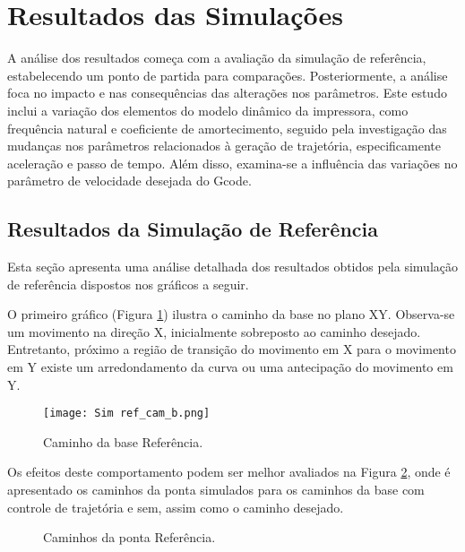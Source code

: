 \section{Resultados das Simulações}
A análise dos resultados começa com a avaliação da simulação de referência, estabelecendo um ponto de partida para comparações. Posteriormente, a análise foca no impacto e nas consequências das alterações nos parâmetros. Este estudo inclui a variação dos elementos do modelo dinâmico da impressora, como frequência natural e coeficiente de amortecimento, seguido pela investigação das mudanças nos parâmetros relacionados à geração de trajetória, especificamente aceleração e passo de tempo. Além disso, examina-se a influência das variações no parâmetro de velocidade desejada do Gcode.

\subsection{Resultados da Simulação de Referência}
Esta seção apresenta uma análise detalhada dos resultados obtidos pela simulação de referência dispostos nos gráficos a seguir.

O primeiro gráfico (Figura \ref{fig:ref_cam_b}) ilustra o caminho da base no plano XY. Observa-se um movimento na direção X, inicialmente sobreposto ao caminho desejado. Entretanto, próximo a região de transição do movimento em X para o movimento em Y existe um arredondamento da curva ou uma antecipação do movimento em Y.

\begin{figure}[H]
    \centering
    \caption{Caminho da base Referência.}
    \texttt{[image: Sim ref\_cam\_b.png]}

    \label{fig:ref_cam_b}
\end{figure}

Os efeitos deste comportamento podem ser melhor avaliados na Figura \ref{fig:ref_cam_p_s}, onde é apresentado os caminhos da ponta simulados para os caminhos da base com controle de trajetória e sem, assim como o caminho desejado.

\begin{figure}[H]
    \centering
    \hfill
    \caption{Caminhos da ponta Referência.}
    \label{fig:ref_cam_p_s}
\end{figure}

